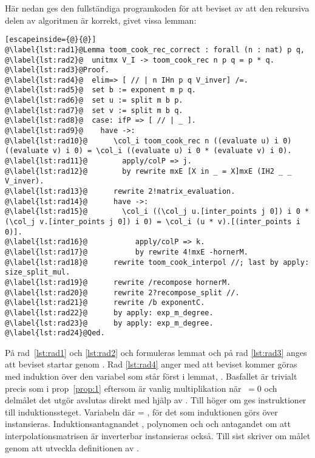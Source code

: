 Här nedan ges den fullständiga programkoden för att beviset av att den
rekursiva delen av algoritmen är korrekt, givet vissa lemman:
\lstset{numbers=left}
\begin{lstlisting}[escapeinside={@}{@}]
@\label{lst:rad1}@Lemma toom_cook_rec_correct : forall (n : nat) p q,
@\label{lst:rad2}@  unitmx V_I -> toom_cook_rec n p q = p * q.
@\label{lst:rad3}@Proof.
@\label{lst:rad4}@  elim=> [ // | n IHn p q V_inver] /=.
@\label{lst:rad5}@  set b := exponent m p q.
@\label{lst:rad6}@  set u := split m b p.
@\label{lst:rad7}@  set v := split m b q.
@\label{lst:rad8}@  case: ifP => [ // | _ ].
@\label{lst:rad9}@    have ->:
@\label{lst:rad10}@      \col_i toom_cook_rec n ((evaluate u) i 0) ((evaluate v) i 0) = \col_i ((evaluate u) i 0 * (evaluate v) i 0).
@\label{lst:rad11}@        apply/colP => j.
@\label{lst:rad12}@        by rewrite mxE [X in _ = X]mxE (IH2 _ _ V_inver).
@\label{lst:rad13}@      rewrite 2!matrix_evaluation.
@\label{lst:rad14}@      have ->:
@\label{lst:rad15}@        \col_i ((\col_j u.[inter_points j 0]) i 0 * (\col_j v.[inter_points j 0]) i 0) = \col_i (u * v).[(inter_points i 0)].
@\label{lst:rad16}@           apply/colP => k.
@\label{lst:rad17}@           by rewrite 4!mxE -hornerM.
@\label{lst:rad18}@      rewrite toom_cook_interpol //; last by apply: size_split_mul.
@\label{lst:rad19}@      rewrite /recompose hornerM.
@\label{lst:rad20}@      rewrite 2?recompose_split //.
@\label{lst:rad21}@      rewrite /b exponentC.
@\label{lst:rad22}@      by apply: exp_m_degree.
@\label{lst:rad23}@      by apply: exp_m_degree.
@\label{lst:rad24}@Qed.
\end{lstlisting}
\lstset{numbers=none}
På rad~\ref{lst:rad1} och \ref{lst:rad2} och formuleras lemmat och på rad
\ref{lst:rad3} anges att beviset startar genom . Rad \ref{lst:rad4}
anger med  att beviset kommer göras med induktion över den variabel
som står först i lemmat, . Basfallet är trivialt precis som i
prop~\ref{prop:1} eftersom  är vanlig multiplikation när
$\ =0$ och delmålet det utgör avslutas direkt med hjälp av \C{//}. Till
höger om \C{|} ges instruktioner till induktionssteget. Variabeln  där
  = , för det  som induktionen görs över instansieras.
Induktionsantagnandet , polynomen  och  och antagandet
 om att interpolationsmatrisen är inverterbar instansieras också.
Till sist skriver \C{/=} om målet genom att utveckla definitionen av
.

